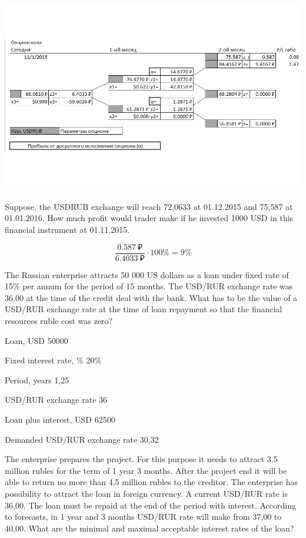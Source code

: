 \documentclass[12pt, table]{exam}
\begin{document}
\begin{questions}
\begin{subparts}
\begin{solution}[20em]
	\includegraphics[height=8.5cm]{img/option_call_usdrub.png}
\end{solution}

\subpart[5] Suppose, the USDRUB exchange will reach 72,0633 at 01.12.2015 and 75,587 at 01.01.2016. How much profit would trader make if he invested 1000 USD in this financial instrument at 01.11.2015.
\begin{solution}[8em]

$$\frac{0.587~₽}{6.4033~₽} \cdot 100\% = 9\% $$

\end{solution}
	
\end{subparts}
\addpoints

\pagebreak
\question[10] The Russian enterprise attracts 50 000 US dollars as a loan under fixed rate of 15\% per annum for the period of 15 months. The USD/RUR exchange rate was 36,00 at the time of the credit deal with the bank. What has to be the value of a USD/RUR exchange rate at the time of loan repayment so that the financial resources ruble cost was zero?

\begin{solution}[8em]

Loan, USD	50000

Fixed interest rate, \%	20\%

Period, years	1,25

USD/RUR exchange rate	36

Loan plus interest, USD	62500

Demanded USD/RUR exchange rate	30,32

\end{solution}

\question[10] The enterprise prepares the project. For this purpose it needs to attract 3.5 million rubles for the term of 1 year 3 months. After the project end it will be able to return no more than 4,5 million rubles to the creditor. The enterprise has possibility to attract the loan in foreign currency. A current USD/RUR rate is 36,00. The loan must be repaid at the end of the period with interest. According to forecasts, in 1 year and 3 months USD/RUR rate will make from 37,00 to 40,00. What are the minimal and maximal acceptable interest rates of the loan?


\end{questions}
\end{document}
